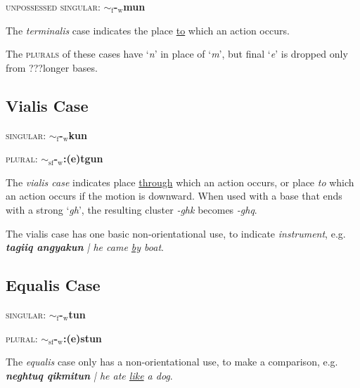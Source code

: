 \documentclass{article}
\begin{document}
\vspace{12pt}

\textsc{unpossessed singular}: \textbf{$\sim_\text{f}$-$_\text{w}$mun}

The \textit{terminalis} case indicates the place \underline{to} which an action occurs.

\vspace{12pt}

The \textsc{plurals} of these cases have `\textit{n}' in place of `\textit{m}', but final `\textit{e}' is dropped only from ???longer bases.

\subsection{Vialis Case}

\textsc{singular}: \textbf{$\sim_\text{f}$-$_\text{w}$kun}

\textsc{plural}: \textbf{$\sim_\text{sf}$-$_\text{w}$:(e)tgun}

\vspace{12pt}

The \textit{vialis case} indicates place \underline{through} which an action occurs, or place \textit{to} which an action occurs if the motion is downward.
%
When used with a base that ends with a strong `\textit{gh}', the resulting cluster \textit{-ghk} becomes \textit{-ghq}.

\vspace{12pt}

The vialis case has one basic non-orientational use, to indicate \textit{instrument}, e.g. \textit{\textbf{tagiiq angyakun} | he came \underline{by} boat}.

\subsection{Equalis Case}

\textsc{singular}: \textbf{$\sim_\text{f}$-$_\text{w}$tun}

\textsc{plural}: \textbf{$\sim_\text{sf}$-$_\text{w}$:(e)stun}

\vspace{12pt}

The \textit{equalis} case only has a non-orientational use, to make a comparison, e.g. \textit{\textbf{neghtuq qikmitun} | he ate \underline{like} a dog}.
\end{document}
